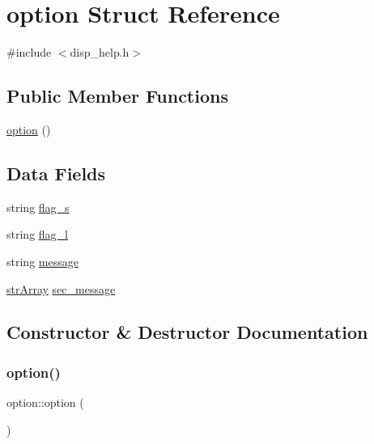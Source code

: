 \hypertarget{structoption}{}\section{option Struct Reference}
\label{structoption}


{\ttfamily \#include $<$disp\+\_\+help.\+h$>$}

\subsection*{Public Member Functions}
\begin{DoxyCompactItemize}
\item 
\mbox{\hyperlink{structoption_a2076b5c924deacb4c76178c848606346}{option}} ()
\end{DoxyCompactItemize}
\subsection*{Data Fields}
\begin{DoxyCompactItemize}
\item 
string \mbox{\hyperlink{structoption_acaef23dbc3257d4604ff42387da63b28}{flag\+\_\+s}}
\item 
string \mbox{\hyperlink{structoption_a3dbb017d487a73bf3873a725d3d49a2a}{flag\+\_\+l}}
\item 
string \mbox{\hyperlink{structoption_aec1e910654c73404ea9ff124937227f4}{message}}
\item 
\mbox{\hyperlink{disp__help_8h_acb0204177ba52d9ff9cd0117150d0bba}{str\+Array}} \mbox{\hyperlink{structoption_a2d5f7a0b934f84ce418c59cdcfece4a8}{sec\+\_\+message}}
\end{DoxyCompactItemize}


\subsection{Constructor \& Destructor Documentation}
\mbox{\label{structoption_a2076b5c924deacb4c76178c848606346}} 
\subsubsection{\texorpdfstring{option()}{option()}}
{\footnotesize\ttfamily option\+::option (\begin{DoxyParamCaption}{ }\end{DoxyParamCaption})\hspace{0.3cm}{\ttfamily [inline]}}



